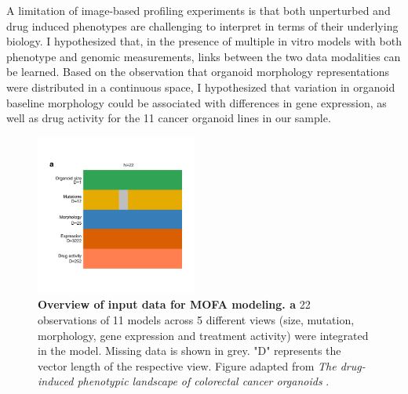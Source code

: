 \begin{flushleft}
A limitation of image-based profiling experiments is that both unperturbed and drug induced phenotypes are challenging to interpret in terms of their underlying biology. I hypothesized that, in the presence of multiple in vitro models with both phenotype and genomic measurements, links between the two data modalities can be learned. Based on the observation that organoid morphology representations were distributed in a continuous space, I hypothesized that variation in organoid baseline morphology could be associated with differences in gene expression, as well as drug activity for the 11 cancer organoid lines in our sample. 

\begin{figure}[h!]
\centering
\includegraphics[width=200,
                height=\textheight,
                keepaspectratio]{figures/promise/pdf/fig_4_2.pdf}
\caption{\textbf{Overview of input data for MOFA modeling. a} 22 observations of 11 models across 5 different views (size, mutation, morphology, gene expression and treatment activity) were integrated in the model. Missing data is shown in grey. "D" represents the vector length of the respective view. Figure adapted from \textit{The drug-induced phenotypic landscape of colorectal cancer organoids} \cite{Betge2022-kr}.}
\label{fig_242}
\end{figure}


\end{flushleft}
